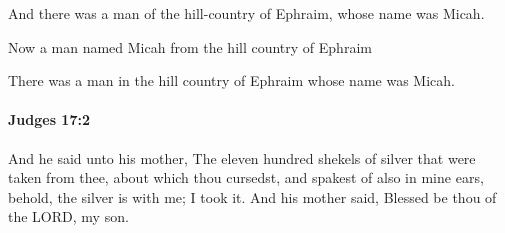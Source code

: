 			\begin{versebox}
					\item[BHS] 
					\item[ASV] And there was a man of the hill-country of Ephraim, whose name was Micah.
					\item[NIV] Now a man named Micah from the hill country of Ephraim
					\item[NRSV] There was a man in the hill country of Ephraim whose name was Micah.
			\end{versebox}

		\paragraph{Judges 17:2} %
			\label{JUDGES-17-2}

			And he said unto his mother, The eleven hundred shekels of silver that were taken from thee, about which thou cursedst, and spakest of also in mine ears, behold, the silver is with me; I took it. And his mother said, Blessed be thou of the LORD, my son.

